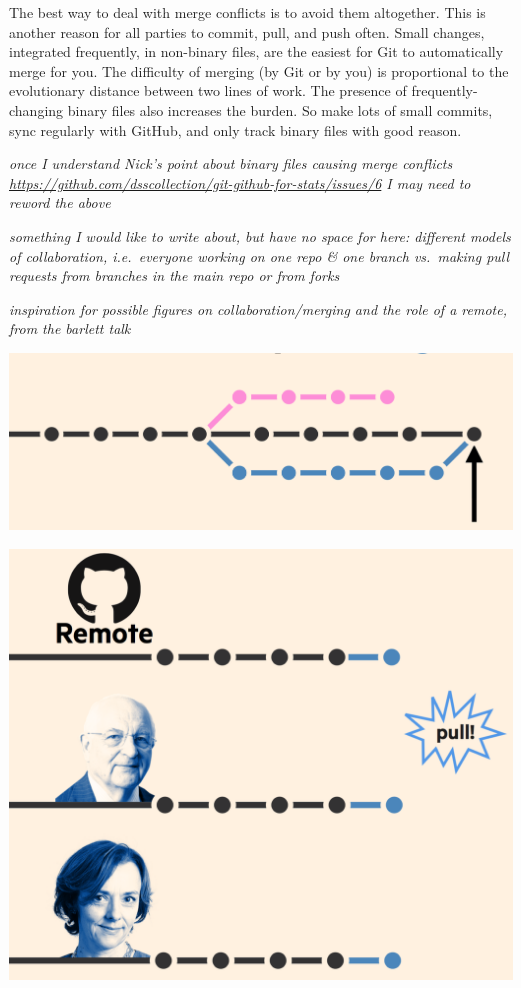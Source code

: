 \documentclass[12pt]{article}
\begin{document}
The best way to deal with merge conflicts is to avoid them altogether.
This is another reason for all parties to commit, pull, and push often.
Small changes, integrated frequently, in non-binary files, are the
easiest for Git to automatically merge for you. The difficulty of
merging (by Git or by you) is proportional to the evolutionary distance
between two lines of work. The presence of frequently-changing binary
files also increases the burden. So make lots of small commits, sync
regularly with GitHub, and only track binary files with good reason.

\emph{once I understand Nick's point about binary files causing merge
conflicts
\url{https://github.com/dsscollection/git-github-for-stats/issues/6} I
may need to reword the above}

\emph{something I would like to write about, but have no space for here:
different models of collaboration, i.e.~everyone working on one repo \&
one branch vs.~making pull requests from branches in the main repo or
from forks}

\emph{inspiration for possible figures on collaboration/merging and the
role of a remote, from the barlett talk}

\includegraphics[width=1\linewidth]{bartlett-merge-commit}

\includegraphics[width=1\linewidth]{bartlett-pull}
\end{document}
